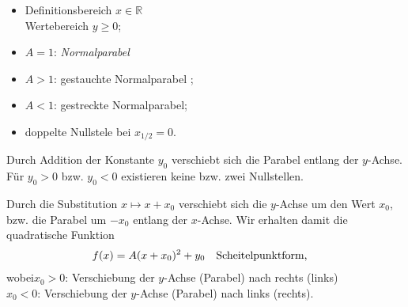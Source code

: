 \begin{minipage}{0.45\textwidth}
    \begin{itemize}
        \item Definitionsbereich $x \in \mathbb{R}$ \\
        Wertebereich $y \ge 0$;
        \item $A = 1$: \emph{Normalparabel} 
        \item $A > 1$: gestauchte Normalparabel ;
        \item $A < 1$: gestreckte Normalparabel;
        \item doppelte Nullstele bei $x_{1/2} = 0.$
    \end{itemize}
\end{minipage}
\begin{minipage}{0.55\textwidth}
        \centering
\end{minipage}

Durch Addition der Konstante $y_0$ verschiebt sich die Parabel entlang der $y$-Achse. Für $y_0 > 0$ bzw. $y_0 <0$ existieren keine bzw. zwei Nullstellen.

Durch die Substitution $x \mapsto x+x_0$ verschiebt sich die $y$-Achse um den Wert $x_0$, bzw. die Parabel um $\minus x_0$ entlang der $x$-Achse. Wir erhalten damit die quadratische Funktion
\begin{align}
    f(x) = A(x+x_0)^2 + y_0 \qq{Scheitelpunktform,}
\end{align}
wobei\quad$x_0 > 0$: Verschiebung der $y$-Achse (Parabel) nach rechts (links) \\
\hphantom{wobei}\quad$x_0 < 0$: Verschiebung der $y$-Achse (Parabel) nach links (rechts).

